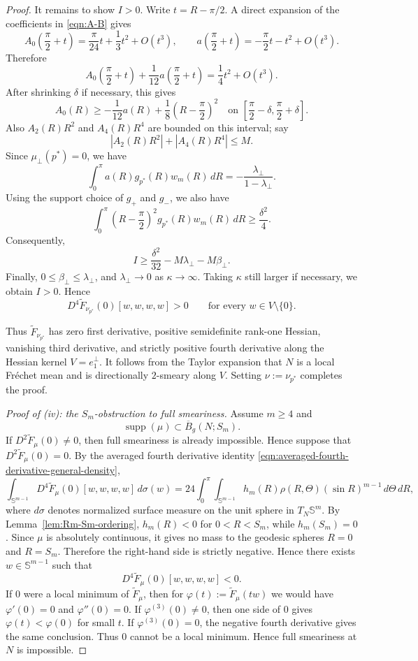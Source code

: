 \documentclass{amsart}
\theoremstyle{definition}
\theoremstyle{remark}
\newcommand\0{\boldsymbol{0}}
\begin{document}
\begin{proof}
It remains to show \(I>0\). Write \(t=R-\pi/2\). A direct expansion of the coefficients in \eqref{eqn:A-B} gives
\[
A_0\left(\frac{\pi}{2}+t\right)=\frac{\pi}{24}t+\frac13t^2+O(t^3),
\qquad
a\left(\frac{\pi}{2}+t\right)=-\frac{\pi}{2}t-t^2+O(t^3).
\]
Therefore
\[
A_0\left(\frac{\pi}{2}+t\right)+\frac1{12}a\left(\frac{\pi}{2}+t\right)
=
\frac14t^2+O(t^3).
\]
After shrinking \(\delta\) if necessary, this gives
\[
A_0(R)\ge -\frac1{12}a(R)+\frac18\left(R-\frac{\pi}{2}\right)^2
\quad\text{on }\left[\frac{\pi}{2}-\delta,\frac{\pi}{2}+\delta\right].
\]
Also \(A_2(R)R^2\) and \(A_4(R)R^4\) are bounded on this interval; say
\[
|A_2(R)R^2|+|A_4(R)R^4|\le M .
\]
Since \(\mu_\perp(p^\ast)=0\), we have
\[
\int_0^\pi a(R)g_{p^\ast}(R)w_m(R)\,dR
=
-\frac{\lambda_\perp}{1-\lambda_\perp}.
\]
Using the support choice of \(g_+\) and \(g_-\), we also have
\[
\int_0^\pi\left(R-\frac{\pi}{2}\right)^2g_{p^\ast}(R)w_m(R)\,dR
\ge \frac{\delta^2}{4}.
\]
Consequently,
\[
I
\ge
\frac{\delta^2}{32}-M\lambda_\perp-M\beta_\perp.
\]
Finally, \(0\le\beta_\perp\le\lambda_\perp\), and \(\lambda_\perp\to0\) as \(\kappa\to\infty\). Taking \(\kappa\) still larger if necessary, we obtain \(I>0\). Hence
\[
D^4\widetilde F_{\nu_{p^\ast}}(0)[w,w,w,w]>0
\qquad\text{for every }w\in V\setminus\{0\}.
\]

Thus \(\widetilde F_{\nu_{p^\ast}}\) has zero first derivative, positive semidefinite rank-one Hessian, vanishing third derivative, and strictly positive fourth derivative along the Hessian kernel \(V=e_1^\perp\). It follows from the Taylor expansion that \(N\) is a local Fréchet mean and is directionally \(2\)-smeary along \(V\). Setting \(\nu:=\nu_{p^\ast}\) completes the proof.


\emph{Proof of (iv): the \(S_m\)-obstruction to full smeariness.}
Assume \(m\ge4\) and
\[
\operatorname{supp}(\mu)\subset \overline B_g(N;S_m).
\]
If \(D^2\widetilde F_\mu(0)\neq0\), then full smeariness is already impossible. Hence suppose that \(D^2\widetilde F_\mu(0)=0\). By the averaged fourth derivative identity \eqref{eqn:averaged-fourth-derivative-general-density},
\[
\int_{\mathbb S^{m-1}}
D^4\widetilde F_\mu(0)[w,w,w,w]\,d\sigma(w)
=
24\int_0^\pi\int_{\mathbb S^{m-1}}
h_m(R)\rho(R,\Theta)(\sin R)^{m-1}\,d\Theta\,dR,
\]
where \(d\sigma\) denotes normalized surface measure on the unit sphere in \(T_N\mathbb S^m\). By Lemma~\ref{lem:Rm-Sm-ordering}, \(h_m(R)<0\) for \(0<R<S_m\), while \(h_m(S_m)=0\). Since \(\mu\) is absolutely continuous, it gives no mass to the geodesic spheres \(R=0\) and \(R=S_m\). Therefore the right-hand side is strictly negative. Hence there exists \(w\in\mathbb S^{m-1}\) such that
\[
D^4\widetilde F_\mu(0)[w,w,w,w]<0.
\]
If \(0\) were a local minimum of \(\widetilde F_\mu\), then for \(\varphi(t):=\widetilde F_\mu(tw)\) we would have \(\varphi'(0)=0\) and \(\varphi''(0)=0\). If \(\varphi^{(3)}(0)\neq0\), then one side of \(0\) gives \(\varphi(t)<\varphi(0)\) for small \(t\). If \(\varphi^{(3)}(0)=0\), the negative fourth derivative gives the same conclusion. Thus \(0\) cannot be a local minimum. Hence full smeariness at \(N\) is impossible.


\end{proof}
\end{document}
